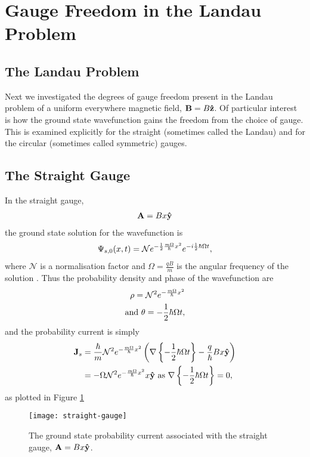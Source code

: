\section{Gauge Freedom in the Landau Problem}
\label{sec:landau}

\subsection{The Landau Problem}

Next we investigated the degrees of gauge freedom present in the Landau problem
of a uniform everywhere magnetic field, $\mathbf{B} = B \mathbf{\hat z }$. Of
particular interest is how the ground state wavefunction gains the freedom from
the choice of gauge. This is examined explicitly for the straight (sometimes
called the Landau) and for the circular (sometimes called symmetric) gauges.

\subsection{The Straight Gauge}

In the straight gauge,
\begin{align}
    \mathbf{A} = Bx\mathbf{\hat y }
    \label{eqn:straight-gauge}
\end{align}
the ground state solution for the wavefunction is
\begin{align}
    \Psi_{s,0}(x,t) = \mathcal{N} e^{- \frac{1}{2} \frac{m \Omega}{\hbar} x^2} e^{-i \frac{1}{2}
        \hbar \Omega t},
\end{align}
where $\mathcal{N}$ is a normalisation factor and $\Omega = \frac{qB}{m}$ is the
angular frequency of the solution \cite{murayama}. Thus the probability density
and phase of the wavefunction are
\begin{align}
    \rho = \mathcal{N}^2 e^{- \frac{m \Omega}{\hbar} x^2} \\
    \mathrm{and}~ \theta = - \frac{1}{2} \hbar \Omega t,
\end{align}
and the probability current is simply
\begin{align}
    \mathbf{J}_s &= \frac{\hbar}{m} \mathcal{N}^2 e^{- \frac{m \Omega}{\hbar} x^2} \left(
        \nabla \left\{ -\frac{1}{2} \hbar \Omega t \right\} - \frac{q}{\hbar} B
        x \mathbf{\hat y } \right) \\
    &= - \Omega \mathcal{N}^2 e^{- \frac{m \Omega}{\hbar} x^2} x\mathbf{\hat y } ~\mathrm{as}~
        \nabla \left\{ -\frac{1}{2} \hbar \Omega t \right\} = 0,
\end{align}
as plotted in Figure \ref{fig:straight}

\begin{figure}
    \texttt{[image: straight-gauge]}
    \caption{The ground state probability current associated with the straight
        gauge, $\mathbf{A} = Bx\mathbf{\hat y }$.}
    \label{fig:straight}
\end{figure}
